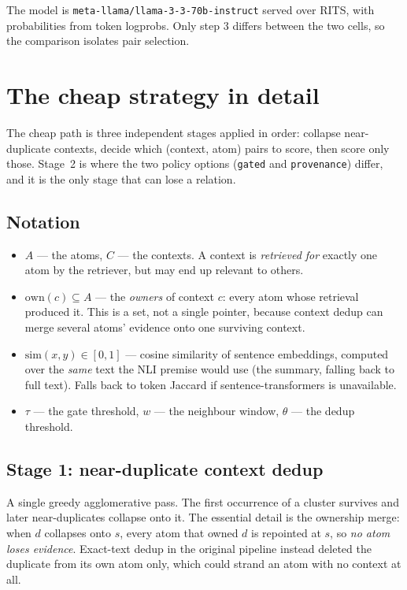 \documentclass[11pt]{article}
\begin{document}
The model is \texttt{meta-llama/llama-3-3-70b-instruct} served over RITS, with probabilities from token logprobs. Only step 3 differs between the two cells, so the comparison isolates pair selection.
\section{The cheap strategy in detail}
\label{sec:algorithm}
The cheap path is three independent stages applied in order: collapse near-duplicate contexts, decide which (context, atom) pairs to score, then score only those. Stage~2 is where the two policy options (\texttt{gated} and \texttt{provenance}) differ, and it is the only stage that can lose a relation.

\subsection{Notation}
\begin{itemize}
  \item $A$ --- the atoms, $C$ --- the contexts. A context is \emph{retrieved for} exactly one atom by the retriever, but may end up relevant to others.
  \item $\mathrm{own}(c) \subseteq A$ --- the \emph{owners} of context $c$: every atom whose retrieval produced it. This is a set, not a single pointer, because context dedup can merge several atoms' evidence onto one surviving context.
  \item $\mathrm{sim}(x,y) \in [0,1]$ --- cosine similarity of sentence embeddings, computed over the \emph{same} text the NLI premise would use (the summary, falling back to full text). Falls back to token Jaccard if sentence-transformers is unavailable.
  \item $\tau$ --- the gate threshold, $w$ --- the neighbour window, $\theta$ --- the dedup threshold.
\end{itemize}

\subsection{Stage 1: near-duplicate context dedup}
A single greedy agglomerative pass. The first occurrence of a cluster survives and later near-duplicates collapse onto it. The essential detail is the ownership merge: when $d$ collapses onto $s$, every atom that owned $d$ is repointed at $s$, so \emph{no atom loses evidence}. Exact-text dedup in the original pipeline instead deleted the duplicate from its own atom only, which could strand an atom with no context at all.
\end{document}
